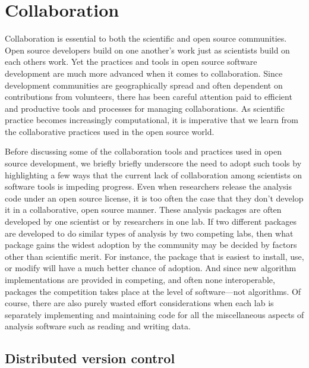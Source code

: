 \documentclass[ChapterTOCs,krantz2]{krantz} %
\theoremstyle{definition}
\begin{document}
\section{\label{sec:collaboration}Collaboration}

Collaboration is essential to both the scientific and open source communities.
Open source developers build on one another's work just as scientists build on
each others work.  Yet the practices and tools in open source software
development are much more advanced when it comes to collaboration. Since
development communities are geographically spread and often dependent on
contributions from volunteers, there has been careful attention paid to
efficient and productive tools and processes for managing collaborations.  As
scientific practice becomes increasingly computational, it is imperative that
we learn from the collaborative practices used in the open source world.

Before discussing some of the collaboration tools and practices used in open
source development, we briefly briefly underscore the need to adopt such tools
by highlighting a few ways that the current lack of collaboration among
scientists on software tools is impeding progress. Even when researchers
release the analysis code under an open source license, it is too often the
case that they don't develop it in a collaborative, open source manner.
These analysis packages are often developed by one scientist or by researchers
in one lab. If two different packages are developed to do similar types
of analysis by two competing labs, then what package gains the widest adoption
by the community may be decided by factors other than scientific merit. For
instance, the package that is easiest to install, use, or modify will have
a much better chance of adoption. And since new algorithm implementations
are provided in competing, and often none interoperable, packages the
competition takes place at the level of software---not algorithms. Of course,
there are also purely wasted effort considerations when each lab is separately
implementing and maintaining code for all the miscellaneous aspects of
analysis software such as reading and writing data.


\subsection{Distributed version control}
\end{document}
